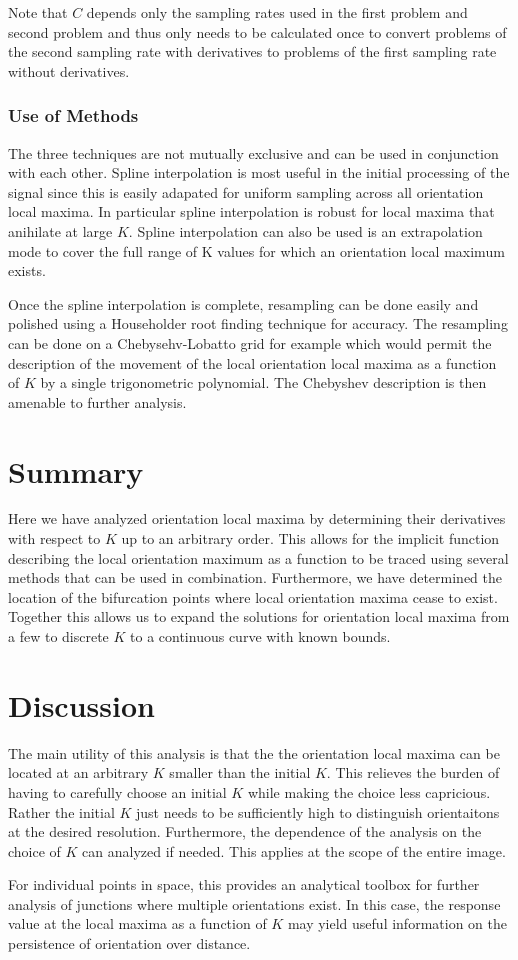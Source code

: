 \documentclass[11pt]{article} %
\begin{document}
Note that $ C $ depends only the sampling rates used in the first problem and second problem and thus only needs to be calculated once to convert problems of the second sampling rate with derivatives to problems of the first sampling rate without derivatives.
\subsubsection{Use of Methods}
The three techniques are not mutually exclusive and can be used in conjunction with each other. Spline interpolation is most useful in the initial processing of the signal since this is easily adapated for uniform sampling across all orientation local maxima. In particular spline interpolation is robust for local maxima that anihilate at large $ K $. Spline interpolation can also be used is an extrapolation mode to cover the full range of K values for which an orientation local maximum exists.

Once the spline interpolation is complete, resampling can be done easily and polished using a Householder root finding technique for accuracy. The resampling can be done on a Chebysehv-Lobatto grid for example which would permit the description of the movement of the local orientation local maxima as a function of  $ K $ by a single trigonometric polynomial. The Chebyshev description is then amenable to further analysis.
\section{Summary}
Here we have analyzed orientation local maxima by determining their derivatives with respect to $ K $ up to an arbitrary order. This allows for the implicit function describing the local orientation maximum as a function to be traced using several methods that can be used in combination. Furthermore, we have determined the location of the bifurcation points where local orientation maxima cease to exist. Together this allows us to expand the solutions for orientation local maxima from a few to discrete $ K $ to a continuous curve with known bounds.
\section{Discussion}
The main utility of this analysis is that the the orientation local maxima can be located at an arbitrary $ K $ smaller than the initial $ K $. This relieves the burden of having to carefully choose an initial $ K $ while making the choice less capricious. Rather the initial $ K $ just needs to be sufficiently high to distinguish orientaitons at the desired resolution. Furthermore, the dependence of the analysis on the choice of $ K $ can analyzed if needed. This applies at the scope of the entire image.

For individual points in space, this provides an analytical toolbox for further analysis of junctions where multiple orientations exist. In this case, the response value at the local maxima as a function of $ K $ may yield useful information on the persistence of orientation over distance. 
\end{document}

